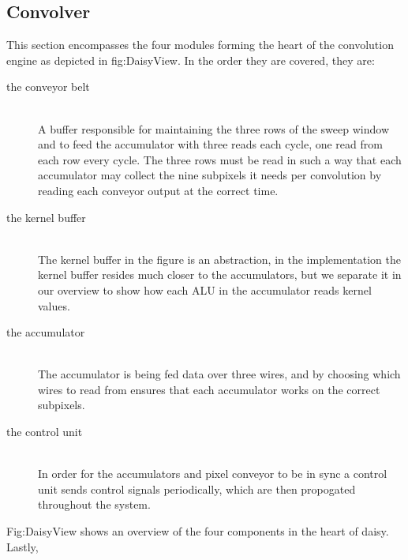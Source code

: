 \subsection{Convolver}
This section encompasses the four modules forming the heart of the convolution engine as depicted in fig:DaisyView. In the order they are covered, they are:
\begin{description}
    \item[the conveyor belt] \hfill\\ 
        A buffer responsible for maintaining the three rows of the sweep window and to feed the accumulator with three reads each cycle, one read from each row every cycle.
        The three rows must be read in such a way that each accumulator may collect the nine subpixels it needs per convolution by reading each conveyor output at the correct time.
    \item[the kernel buffer] \hfill\\
        The kernel buffer in the figure is an abstraction, in the implementation the kernel buffer resides much closer to the accumulators, but we separate it in our overview to show how each ALU in the accumulator reads kernel values.
    \item[the accumulator] \hfill\\
        The accumulator is being fed data over three wires, and by choosing which wires to read from ensures that each accumulator works on the correct subpixels.
    \item[the control unit] \hfill\\
        In order for the accumulators and pixel conveyor to be in sync a control unit sends control signals periodically, which are then propogated throughout the system.
\end{description}
Fig:DaisyView shows an overview of the four components in the heart of daisy. 
Lastly, 
